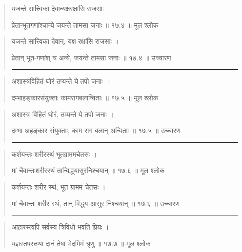 \begin{quotation}

यजन्ते सात्त्विका देवान्यक्षरक्षांसि राजसाः ।  

प्रेतान्भूतगणांश्चान्ये जयन्ते तामसा जनाः  ॥ १७.४ ॥  मूल श्लोक
\end{quotation}

\begin{quotation}

यजन्ते सात्त्विका देवान्, यक्ष रक्षांसि राजसाः ।  

प्रेतान् भूत-गणांश् च अन्ये, जयन्ते तामसा जनाः  ॥ १७.४ ॥  उच्चारण

\noindent\rule{16cm}{0.4pt} 
\end{quotation}


\begin{quotation}

अशास्त्रविहितं घोरं तप्यन्ते ये तपो जनाः ।  

दम्भाहङ्‍कारसंयुक्ताः कामरागबलान्विताः  ॥ १७.५ ॥  मूल श्लोक
\end{quotation}

\begin{quotation}
अशास्त्र विहितं घोरं, तप्यन्ते ये तपो जनाः ।  

दम्भा अहङ्‍कार संयुक्ताः, काम राग बलान् अन्विताः  ॥ १७.५ ॥  उच्चारण

\noindent\rule{16cm}{0.4pt} 
\end{quotation}


\begin{quotation}

कर्शयन्तः शरीरस्थं भूतग्राममचेतसः ।  

मां चैवान्तःशरीरस्थं तान्विद्ध्‌यासुरनिश्चयान्‌  ॥ १७.६ ॥  मूल श्लोक
\end{quotation}

\begin{quotation}

कर्शयन्तः शरीर स्थं, भूत ग्रामम चेतसः ।  

मां चैवान्तः शरीर स्थं, तान् विद्ध्‌य आसुर निश्चयान्‌  ॥ १७.६ ॥  उच्चारण

\noindent\rule{16cm}{0.4pt} 
\end{quotation}


\begin{quotation}

आहारस्त्वपि सर्वस्य त्रिविधो भवति प्रियः ।  

यज्ञस्तपस्तथा दानं तेषां भेदमिमं श्रृणु  ॥ १७.७ ॥  मूल श्लोक
\end{quotation}

